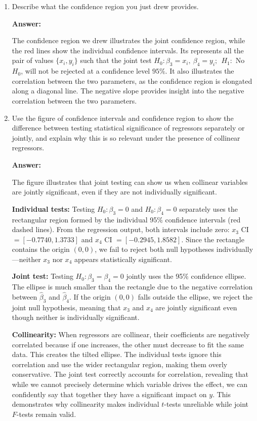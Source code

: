 \documentclass[12pt,a4paper]{article}
\begin{document}
\begin{enumerate}[label=(\roman*)]
  \item Describe what the confidence region you just drew provides.
  
  \textbf{Answer:} 

  The confidence region we drew illustrates the joint confidence region, while the red lines show the individual confidence intervals.
  Its represents all the pair of values $\{x_i, y_i\}$ such that the joint test $H_0 : \beta_3 = x_i , \: \beta_4 = y_i;\:\: H_1 : $ No $H_0$, will not be rejected at a confidence level $95\%$.
  It also illustrates the correlation between the two parameters, as the confidence region is elongated along a diagonal line. The negative slope provides 
  insight into the negative correlation between the two parameters.
  
  \item Use the figure of confidence intervals and confidence region to show the difference between testing statistical significance of regressors separately or jointly, and explain why this is so relevant under the presence of collinear regressors.
  
  \textbf{Answer:} 

The figure illustrates that joint testing can show us when collinear variables are jointly significant, even if they are not individually significant.

\textbf{Individual tests:} Testing $H_0: \beta_3=0$ and 
$H_0: \beta_4=0$ separately uses the rectangular region formed by the 
individual 95\% confidence intervals (red dashed lines). From the regression output,
both intervals include zero: $x_3$ CI 
$= [-0.7740, 1.3733]$ and $x_4$ CI $= [-0.2945, 1.8582]$. Since the 
rectangle contains the origin $(0,0)$, we fail to reject both null 
hypotheses individually---neither $x_3$ nor $x_4$ appears statistically 
significant.

\textbf{Joint test:} Testing $H_0: \beta_3=\beta_4=0$ jointly uses the 
95\% confidence ellipse. The ellipse is much smaller than the rectangle 
due to the negative correlation between $\hat{\beta}_3$ and 
$\hat{\beta}_4$. If the origin $(0,0)$ falls outside the ellipse, we 
reject the joint null hypothesis, meaning that $x_3$ and $x_4$ are jointly 
significant even though neither is individually significant.

\textbf{Collinearity:} When regressors are collinear, their 
coefficients are negatively correlated because if one increases, the other
must decrease to fit the same 
data. This creates the tilted ellipse. The individual tests ignore this 
correlation and use the wider rectangular region, making them overly 
conservative. The joint test correctly accounts for correlation, 
revealing that while we cannot precisely determine which variable drives 
the effect, we can confidently say that together they have a significant 
impact on $y$. This demonstrates why collinearity makes individual 
$t$-tests unreliable while joint $F$-tests remain valid.


\end{enumerate}
\end{document}
